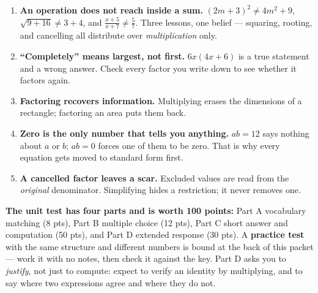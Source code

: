 \boxguard[16]
\begin{spiralbox}
\small
\begin{enumerate}[leftmargin=1.5em, itemsep=3pt, topsep=2pt]
  \item \textbf{An operation does not reach inside a sum.} $(2m+3)^2 \ne 4m^2+9$,
        $\sqrt{9+16} \ne 3+4$, and $\frac{x+5}{x+7} \ne \frac57$. Three lessons, one belief ---
        squaring, rooting, and cancelling all distribute over \emph{multiplication} only.
  \item \textbf{``Completely'' means largest, not first.} $6x(4x+6)$ is a true statement and a
        wrong answer. Check every factor you write down to see whether it factors again.
  \item \textbf{Factoring recovers information.} Multiplying erases the dimensions of a rectangle;
        factoring an area puts them back.
  \item \textbf{Zero is the only number that tells you anything.} $ab=12$ says nothing about $a$
        or $b$; $ab=0$ forces one of them to be zero. That is why every equation gets moved to
        standard form first.
  \item \textbf{A cancelled factor leaves a scar.} Excluded values are read from the
        \emph{original} denominator. Simplifying hides a restriction; it never removes one.
\end{enumerate}
\end{spiralbox}

\vspace{0.12in}

\boxguard[8]
\begin{remindbox}
\small
\textbf{The unit test has four parts and is worth 100 points:} Part A vocabulary matching
(8 pts), Part B multiple choice (12 pts), Part C short answer and computation (50 pts), and
Part D extended response (30 pts). A \textbf{practice test} with the same structure and
different numbers is bound at the back of this packet --- work it with no notes, then check it
against the key. Part D asks you to \emph{justify}, not just to compute: expect to verify an
identity by multiplying, and to say where two expressions agree and where they do not.
\end{remindbox}
